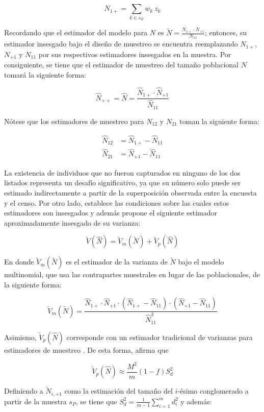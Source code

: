 \documentclass[
  12pt,
]{book}
\begin{document}
\[
\hat{N}_{1+} = \sum_{k \in s_E} w_k \ z_{k}
\]

Recordando que el estimador del modelo para \(N\) es \(\tilde{N} = \frac{ N_{1+} \cdot N_{+1}}{N_{11}}\); entonces, su estimador insesgado bajo el diseño de muestreo se encuentra reemplazando \(N_{1+}\), \(N_{+1}\) y \(N_{11}\) por sus respectivos estimadores insesgados en la muestra. Por consiguiente, se tiene que el estimador de muestreo del tamaño poblacional \(N\) tomará la siguiente forma:

\[
\hat{N}_{++} = \hat{N} = \frac{\hat{N}_{1+} \cdot \hat{N}_{+1}}{\hat{N}_{11}}
\]

Nótese que los estimadores de muestreo para \({N}_{12}\) y \({N}_{21}\) toman la siguiente forma:

\[
\begin{aligned}
\hat{N}_{12} &= \hat{N}_{1+} - \hat{N}_{11} \\
\hat{N}_{21} &= \hat{N}_{+1} - \hat{N}_{11}
\end{aligned}
\]

La existencia de individuos que no fueron capturados en ninguno de los dos listados representa un desafío significativo, ya que su número solo puede ser estimado indirectamente a partir de la superposición observada entre la encuesta y el censo. Por otro lado, \citet{wolter1986coverage} establece las condiciones sobre las cuales estos estimadores son insesgados y además propone el siguiente estimador aproximadamente insesgado de su varianza:

\[
\tilde{V}(\hat{N}) =  \tilde{V}_m(\tilde{N}) + \tilde{V}_p(\hat{N})
\]

En donde \(\tilde{V}_m(\tilde{N})\) es el estimador de la varianza de \(\tilde{N}\) bajo el modelo multinomial, que usa las contrapartes muestrales en lugar de las poblacionales, de la siguiente forma:

\[
\tilde{V}_m(\tilde{N}) = \frac{\hat{N}_{1+} \cdot \hat{N}_{+1} \cdot (\hat{N}_{1+} - \hat{N}_{11}) \cdot (\hat{N}_{+1} - \hat{N}_{11})}{\hat{N}_{11}^3}
\]

Asimismo, \(\tilde V_p (\hat{N})\) corresponde con un estimador tradicional de varianzas para estimadores de muestreo \citep{CEPAL_2023}. De esta forma, \citet[sección 3.1.]{wolter1986coverage} afirma que

\[
\tilde V_p (\hat{N}) \approx \frac{M^2}{m}(1-f)S^2_{d}
\]

Definiendo a \(\tilde{N}_{i, +1}\) como la estimación del tamaño del \(i\)-ésimo conglomerado a partir de la muestra \(s_P\), se tiene que \(S^2_{d} = \frac{1}{m-1}\sum_{i=1}^m d_i^2\) y además:
\end{document}
